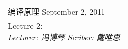 \def\lecture{2}
\clearpage \noindent\begin{tabularx}{\linewidth}{|X|}
\hline \vskip -2mm
{\sf 编译原理} \hfill September 2, 2011 \\
{\centering \sf \large Lecture \lecture:
 \\ }
\textsl{Lecturer: 冯博琴 \hfill Scriber: 戴唯思}\\ \hline
\end{tabularx}
\setcounter{section}{0}
\renewcommand{\thepage}{\lecture -\arabic{page}}

